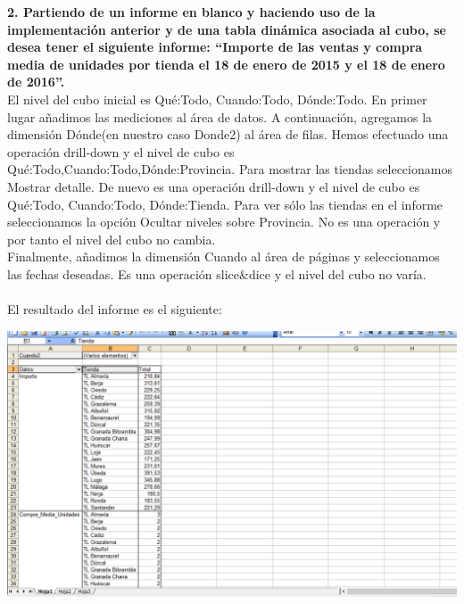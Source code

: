 \documentclass[paper=a4, fontsize=11pt, spanish]{scrartcl}
\numberwithin{equation}{section} %
\numberwithin{figure}{section} %
\numberwithin{table}{section} %
\begin{document}
\textbf{2. Partiendo de un informe en blanco y haciendo uso de la implementación anterior y de una tabla dinámica asociada al cubo, se desea tener el siguiente informe: “Importe de las ventas y compra media de unidades por tienda el 18 de enero de 2015 y el 18 de enero de 2016”.}
\\
El nivel del cubo inicial es Qué:Todo, Cuando:Todo, Dónde:Todo. En primer lugar añadimos las mediciones al área de datos. A continuación, agregamos la dimensión Dónde(en nuestro caso Donde2) al área de filas. Hemos efectuado una operación drill-down y el nivel de cubo es Qué:Todo,Cuando:Todo,Dónde:Provincia. Para mostrar las tiendas seleccionamos Mostrar detalle. De nuevo es una operación drill-down y el nivel de cubo es Qué:Todo, Cuando:Todo, Dónde:Tienda. Para ver sólo las tiendas en el informe seleccionamos la opción Ocultar niveles sobre Provincia. No es una operación y por tanto el nivel del cubo no cambia.\\
Finalmente, añadimos la dimensión Cuando al área de páginas y seleccionamos las fechas deseadas. Es una operación slice\&dice y el nivel del cubo no varía.\\
\\
El resultado del informe es el siguiente:
\\
\begin{center}
	\includegraphics[scale=0.75]{img9.png}
\end{center}
\end{document}
